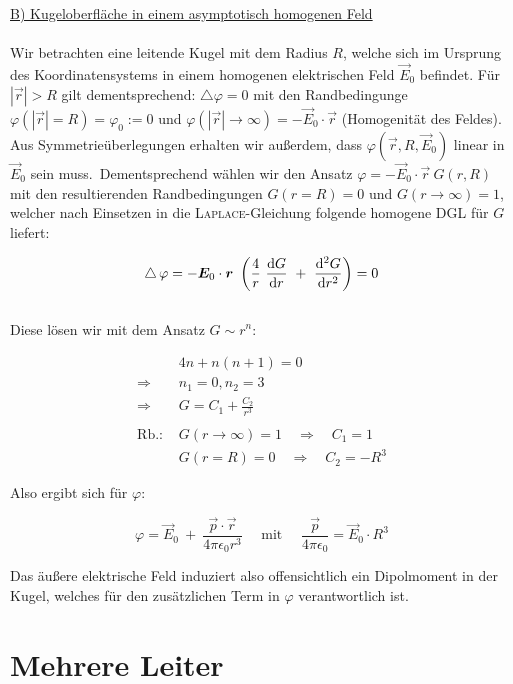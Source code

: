 \underline{B) Kugeloberfläche in einem asymptotisch homogenen Feld}\
\\
\ \\
Wir betrachten eine leitende Kugel mit dem Radius $R$, welche sich im Ursprung des Koordinatensystems in einem homogenen elektrischen Feld $\vec{E}_0$ befindet. Für $|\vec{r}|>R$ gilt dementsprechend: $\bigtriangleup\varphi = 0$ mit den Randbedingunge $\varphi(|\vec{r}| = R) = \varphi_0 := 0$ und $\varphi(|\vec{r}|\rightarrow\infty) = -\vec{E}_0\cdot\vec{r}$ (Homogenität des Feldes). Aus Symmetrieüberlegungen erhalten wir außerdem, dass $\varphi(\vec{r},R,\vec{E}_0)$ linear in $\vec{E}_0$ sein muss.\
Dementsprechend wählen wir den Ansatz $\varphi = -\vec{E}_0 \cdot\vec{r} \ G(r,R)$ mit den resultierenden Randbedingungen $G(r=R)=0$ und $G(r\rightarrow\infty
) =1$, welcher nach Einsetzen in die \textsc{Laplace}-Gleichung folgende homogene DGL für $G$ liefert:

\begin{equation*}
\mathop{{}\bigtriangleup}\nolimits\varphi = -\bm{E}_0\cdot\bm{r} \ \left(\frac{4}{r} \ \frac{\mathrm{d}{G}}{\mathrm{d}{r}} \ + \ \frac{\mathrm{d}^2{G}}{\mathrm{d}{r}^2}\right) = 0
\end{equation*}
\ \\
Diese lösen wir mit dem Ansatz $ G \sim r^n$:


\begin{align*}
& 4n + n(n+1) = 0\\
\Rightarrow & n_1 = 0, n_2=3\\
\Rightarrow & G = C_1 + \frac{C_2}{r^3}\\
\ \\
\text{Rb.: } & G(r\rightarrow\infty) = 1 \quad \Rightarrow \quad C_1 = 1\\
& G(r=R) = 0 \quad \Rightarrow \quad C_2 = -R^3 
\end{align*}

Also ergibt sich für $\varphi$:

\begin{equation*}
\varphi = \vec{E}_0 \ + \ \frac{\vec{p} \cdot\vec{r}}{4\pi\epsilon_0 r^3} \quad
\text{ mit } \quad \frac{\vec{p}}{4\pi\epsilon_0} = \vec{E}_0 \cdot R^3
\end{equation*}

Das äußere elektrische Feld induziert also offensichtlich ein Dipolmoment in der Kugel, welches für den zusätzlichen Term in $\varphi$ verantwortlich ist.

\section{Mehrere Leiter}

